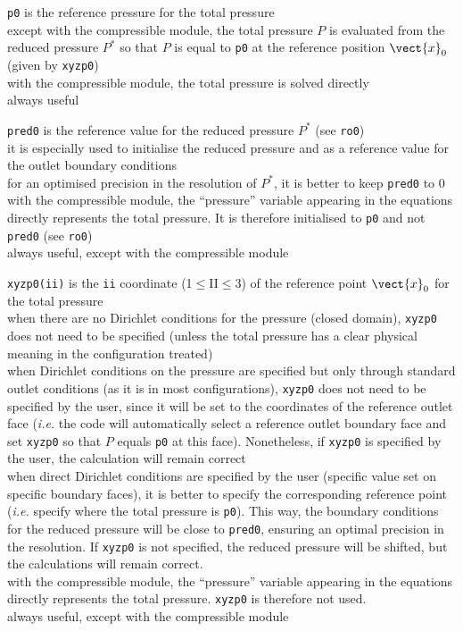 {{\tt p0} is the reference pressure for the total
pressure\\
except with the compressible module, the total pressure $P$ is evaluated
from the reduced pressure $P^*$ so that $P$
is equal to {\tt p0} at the reference position $\vect{x}_0$ (given by {\tt xyzp0})\\
with the compressible module, the total pressure is solved directly\\
always useful}

{{\tt pred0} is the reference value for the reduced
pressure $P^*$ (see {\tt ro0})\\
it is especially used to initialise the reduced pressure and as a reference
value for the outlet boundary conditions\\
for an optimised precision in the resolution of $P^*$, it is better to keep {\tt pred0}
to 0\\
with the compressible module, the ``pressure'' variable appearing in the
equations directly represents the total pressure. It is therefore initialised
to {\tt p0} and not {\tt pred0} (see {\tt ro0})\\
always useful, except with the compressible module}

{{\tt xyzp0(ii)} is the {\tt ii} coordinate
(1$\leqslant$II$\leqslant$3) of the reference point $\vect{x}_0$ for the
total pressure\\
when there are no Dirichlet conditions for the pressure (closed domain), {\tt xyzp0}
does not need to be specified (unless the total pressure has a clear physical
meaning in the configuration treated)\\
when Dirichlet conditions on the pressure are specified but only through standard
outlet conditions (as it is in most configurations),
{\tt xyzp0} does not need to be specified by the user, since it will be set to the
coordinates of the reference outlet face ({\em i.e.} the code will automatically
select a
reference outlet boundary face and set {\tt xyzp0} so that $P$ equals {\tt p0} at this
face). Nonetheless, if {\tt xyzp0} is specified by the user, the calculation will remain
correct\\
when direct Dirichlet conditions are specified by the user (specific value set
on specific boundary faces), it is better to specify the corresponding reference
point ({\em i.e.} specify where the total pressure is {\tt p0}). This way, the
boundary conditions for the reduced pressure will be close to {\tt pred0}, ensuring an
optimal precision in the resolution. If {\tt xyzp0} is not specified, the reduced
pressure will be shifted, but the calculations will remain correct.\\
with the compressible module, the ``pressure'' variable appearing in the
equations directly represents the total pressure. {\tt xyzp0} is therefore not used.\\
always useful, except with the compressible module}

